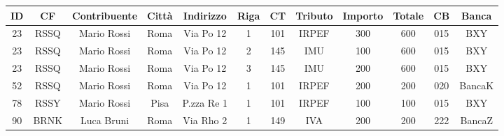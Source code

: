 \documentclass{standalone}
\begin{document}
\begin{tabular}{|c|c|c|c|c|c|c|c|c|c|c|c|}
    \hline
    ID&CF&Contribuente&Città&Indirizzo&Riga&CT&Tributo&Importo&Totale&CB&Banca\\\hline
    23&RSSQ&Mario Rossi&Roma&Via Po 12&1&101&IRPEF&300&600&015&BXY\\\hline
    23&RSSQ&Mario Rossi&Roma&Via Po 12&2&145&IMU&100&600&015&BXY\\\hline
    23&RSSQ&Mario Rossi&Roma&Via Po 12&3&145&IMU&200&600&015&BXY\\\hline
    52&RSSQ&Mario Rossi&Roma&Via Po 12&1&101&IRPEF&200&200&020&BancaK\\\hline
    78&RSSY&Mario Rossi&Pisa&P.zza Re 1&1&101&IRPEF&100&100&015&BXY\\\hline
    90&BRNK&Luca Bruni&Roma&Via Rho 2&1&149&IVA&200&200&222&BancaZ\\\hline
\end{tabular}
\end{document}

